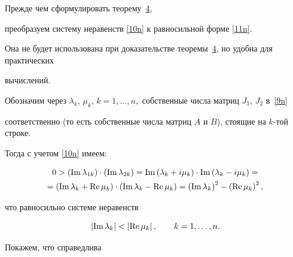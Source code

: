 Прежде чем сформулировать теорему~\hyperlink{nik:th4}{4},

преобразуем систему неравенств \eqref{10n} к равносильной форме \eqref{11n}.

Она не будет использована при доказательстве теоремы~\hyperlink{nik:th4}{4}, но удобна для практических

вычислений.



Обозначим через  $\lambda_k$, $\mu_k$,  $k=1,\ldots, n,$ собственные  числа   матриц $J_1$, $J_2$ в~\eqref{9n}

  соответственно (то есть собственные числа матриц $A$ и $B$),  стоящие на $k$-той строке. 

  Тогда с учетом \eqref{10n} имеем:

\begin{multline}

0>\left(\mathop{\rm Im} \lambda_{1k}\right)\cdot \left(\mathop{\rm Im} \lambda_{2k} \right)

=\mathop{\rm Im}\left(\lambda_k+i\mu_k \right)\cdot \mathop{\rm Im}\left(\lambda_k-i\mu_k\right)=

\\

=

\left(\mathop{\rm Im} \lambda_k+\mathop{\rm Re} \mu_k \right)\cdot

\left(\mathop{\rm Im} \lambda_k-\mathop{\rm Re} \mu_k \right)=

\left(\mathop{\rm Im} \lambda_k \right)^2-

\left(\mathop{\rm Re} \mu_k \right)^2,

\end{multline}

что равносильно системе неравенств

\begin{equation}

\left|\mathop{\rm Im} \lambda_k\right|<

\left|\mathop{\rm Re} \mu_k\right|,\quad

\quad  k=1,\ldots,n.

 \label{11n}

\end{equation}



Покажем, что справедлива



\smallskip



\hypertarget{nik:th4}{}

